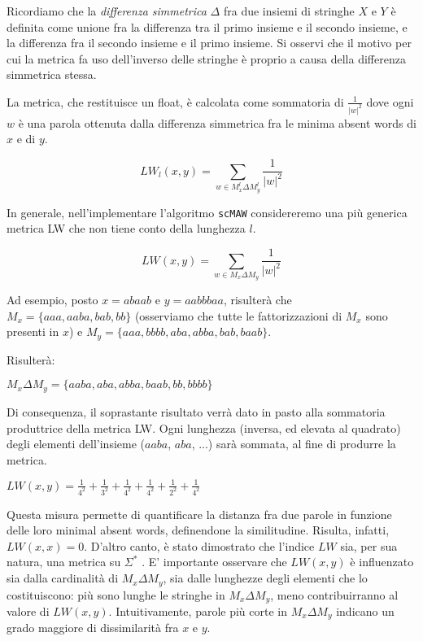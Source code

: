 Ricordiamo che la \textit{differenza simmetrica} $\Delta$ fra due insiemi di stringhe $X$ e $Y$ è definita come unione fra la differenza tra il primo insieme e il secondo insieme, e la differenza fra il secondo insieme e il primo insieme. Si osservi che il motivo per cui la metrica fa uso dell'inverso delle stringhe è proprio a causa della differenza simmetrica stessa.

\vspace{3mm}

La metrica, che restituisce un float, è calcolata come sommatoria di $\frac{1}{|w|^2}$ dove ogni $w$ è una parola ottenuta dalla differenza simmetrica fra le minima absent words di $x$ e di $y$.

\[LW_l (x, y)=\sum_{w \in M^l_x \Delta M^l_y} \frac{1}{|w|^2 }\]

\vspace{3mm}

In generale, nell'implementare l'algoritmo \verb|scMAW| considereremo una più generica metrica LW che non tiene conto della lunghezza $l$.

\[LW (x, y)=\sum_{w \in M_x \Delta M_y} \frac{1}{|w|^2 }\]

Ad esempio, posto $x=abaab$ e $y=aabbbaa$, risulterà che $M_x= \{ aaa, aaba, bab, bb \} $ (osserviamo che tutte le fattorizzazioni di $M_x$ sono presenti in $x$) e $M_y=\{ aaa,bbbb,aba,abba,bab,baab \}$.

\vspace{3mm}

Risulterà:

\vspace{3mm}

\(M_x \Delta M_y = \{ aaba,aba,abba,baab,bb,bbbb \} \)

\vspace{3mm}

Di consequenza, il soprastante risultato verrà dato in pasto alla sommatoria produttrice della metrica LW. Ogni lunghezza (inversa, ed elevata al quadrato) degli elementi dell'insieme ($aaba$, $aba$, ...) sarà sommata, al fine di produrre la metrica.

\vspace{3mm}

\(LW(x,y) = \frac{1}{4^2}+\frac{1}{3^2}+\frac{1}{4^2}+\frac{1}{4^2}+\frac{1}{2^2}+\frac{1}{4^2}\)

\vspace{3mm}

Questa misura permette di quantificare la distanza fra due parole in funzione delle loro minimal absent words, definendone la similitudine. Risulta, infatti, $LW(x,x)=0$. D'altro canto, è stato dimostrato che l'indice $LW$ sia, per sua natura, una metrica su $\Sigma^*$ \cite{scMAW}. E' importante osservare che $LW(x,y)$ è influenzato sia dalla cardinalità di $M_x \Delta M_y$, sia dalle lunghezze degli elementi che lo costituiscono: più sono lunghe le stringhe in $M_x \Delta M_y$, meno contribuirranno al valore di $LW(x,y)$. Intuitivamente, parole più corte in $M_x \Delta M_y$ indicano un grado maggiore di dissimilarità fra $x$ e $y$.